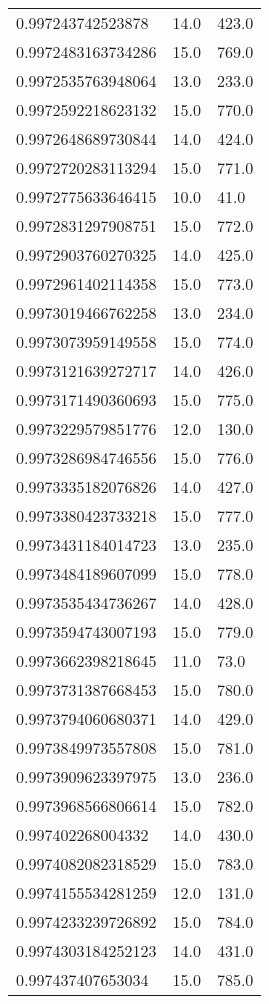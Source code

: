 \begin{center}
\begin{supertabular}[H]{p{0.30\textwidth}p{0.05\textwidth}p{0.05\textwidth}}
0.997243742523878 & 14.0 & 423.0 \\ 
0.9972483163734286 & 15.0 & 769.0 \\ 
0.9972535763948064 & 13.0 & 233.0 \\ 
0.9972592218623132 & 15.0 & 770.0 \\ 
0.9972648689730844 & 14.0 & 424.0 \\ 
0.9972720283113294 & 15.0 & 771.0 \\ 
0.9972775633646415 & 10.0 & 41.0 \\ 
0.9972831297908751 & 15.0 & 772.0 \\ 
0.9972903760270325 & 14.0 & 425.0 \\ 
0.9972961402114358 & 15.0 & 773.0 \\ 
0.9973019466762258 & 13.0 & 234.0 \\ 
0.9973073959149558 & 15.0 & 774.0 \\ 
0.9973121639272717 & 14.0 & 426.0 \\ 
0.9973171490360693 & 15.0 & 775.0 \\ 
0.9973229579851776 & 12.0 & 130.0 \\ 
0.9973286984746556 & 15.0 & 776.0 \\ 
0.9973335182076826 & 14.0 & 427.0 \\ 
0.9973380423733218 & 15.0 & 777.0 \\ 
0.9973431184014723 & 13.0 & 235.0 \\ 
0.9973484189607099 & 15.0 & 778.0 \\ 
0.9973535434736267 & 14.0 & 428.0 \\ 
0.9973594743007193 & 15.0 & 779.0 \\ 
0.9973662398218645 & 11.0 & 73.0 \\ 
0.9973731387668453 & 15.0 & 780.0 \\ 
0.9973794060680371 & 14.0 & 429.0 \\ 
0.9973849973557808 & 15.0 & 781.0 \\ 
0.9973909623397975 & 13.0 & 236.0 \\ 
0.9973968566806614 & 15.0 & 782.0 \\ 
0.997402268004332 & 14.0 & 430.0 \\ 
0.9974082082318529 & 15.0 & 783.0 \\ 
0.9974155534281259 & 12.0 & 131.0 \\ 
0.9974233239726892 & 15.0 & 784.0 \\ 
0.9974303184252123 & 14.0 & 431.0 \\ 
0.997437407653034 & 15.0 & 785.0 \\ 

\end{supertabular}
\end{center}
